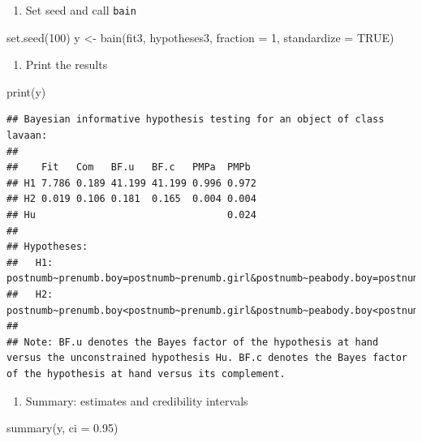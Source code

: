 \documentclass[
]{book}
\newenvironment{Shaded}{\begin{snugshade}}{\end{snugshade}}
\newcommand{\AttributeTok}[1]{\textcolor[rgb]{0.77,0.63,0.00}{#1}}
\newcommand{\ConstantTok}[1]{\textcolor[rgb]{0.00,0.00,0.00}{#1}}
\newcommand{\DecValTok}[1]{\textcolor[rgb]{0.00,0.00,0.81}{#1}}
\newcommand{\FloatTok}[1]{\textcolor[rgb]{0.00,0.00,0.81}{#1}}
\newcommand{\FunctionTok}[1]{\textcolor[rgb]{0.00,0.00,0.00}{#1}}
\newcommand{\NormalTok}[1]{#1}
\newcommand{\OtherTok}[1]{\textcolor[rgb]{0.56,0.35,0.01}{#1}}
\providecommand{\tightlist}{%
  \setlength{\itemsep}{0pt}\setlength{\parskip}{0pt}}
\begin{document}
\begin{enumerate}
\def\labelenumi{\arabic{enumi})}
\setcounter{enumi}{2}
\tightlist
\item
  Set seed and call \texttt{bain}
\end{enumerate}

\begin{Shaded}
\begin{Highlighting}[]
\FunctionTok{set.seed}\NormalTok{(}\DecValTok{100}\NormalTok{)}
\NormalTok{y }\OtherTok{\textless{}{-}} \FunctionTok{bain}\NormalTok{(fit3, hypotheses3, }\AttributeTok{fraction =} \DecValTok{1}\NormalTok{, }\AttributeTok{standardize =} \ConstantTok{TRUE}\NormalTok{)}
\end{Highlighting}
\end{Shaded}

\begin{enumerate}
\def\labelenumi{\arabic{enumi})}
\setcounter{enumi}{3}
\tightlist
\item
  Print the results
\end{enumerate}

\begin{Shaded}
\begin{Highlighting}[]
\FunctionTok{print}\NormalTok{(y)}
\end{Highlighting}
\end{Shaded}

\begin{verbatim}
## Bayesian informative hypothesis testing for an object of class lavaan:
## 
##    Fit   Com   BF.u   BF.c   PMPa  PMPb 
## H1 7.786 0.189 41.199 41.199 0.996 0.972
## H2 0.019 0.106 0.181  0.165  0.004 0.004
## Hu                                 0.024
## 
## Hypotheses:
##   H1: postnumb~prenumb.boy=postnumb~prenumb.girl&postnumb~peabody.boy=postnumb~peabody.girl
##   H2: postnumb~prenumb.boy<postnumb~prenumb.girl&postnumb~peabody.boy<postnumb~peabody.girl
## 
## Note: BF.u denotes the Bayes factor of the hypothesis at hand versus the unconstrained hypothesis Hu. BF.c denotes the Bayes factor of the hypothesis at hand versus its complement.
\end{verbatim}

\begin{enumerate}
\def\labelenumi{\arabic{enumi})}
\setcounter{enumi}{4}
\tightlist
\item
  Summary: estimates and credibility intervals
\end{enumerate}

\begin{Shaded}
\begin{Highlighting}[]
\FunctionTok{summary}\NormalTok{(y, }\AttributeTok{ci =} \FloatTok{0.95}\NormalTok{)}
\end{Highlighting}
\end{Shaded}
\end{document}
